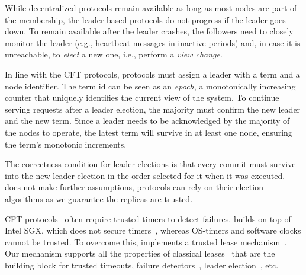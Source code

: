 While decentralized protocols remain available as long as most nodes are part of the membership, the leader-based protocols do not progress if the leader goes down. To remain available after the leader crashes, the followers need to closely monitor the leader (e.g., heartbeat messages in inactive periods) and, in case it is unreachable, to \emph{elect} a new one, i.e., perform a \emph{view change}.



In line with the CFT protocols, \projecttitle{} protocols must assign a leader with a term and a node identifier. The term id can be seen as an \emph{epoch}, a monotonically increasing counter that uniquely identifies the current view of the system. To continue serving requests after a leader election, the majority must confirm the new leader and the new term. Since a leader needs to be acknowledged by the majority of the nodes to operate, the latest term will survive in at least one node, ensuring the term's monotonic increments.

 The correctness condition for leader elections is that every commit must survive into the new leader election in the order selected for it when it was executed. \projecttitle{} does not make further assumptions, protocols can rely on their election algorithms as we guarantee the replicas are trusted.%

 CFT protocols~\cite{raft, chain-replication} often require trusted timers to detect failures. \projecttitle{} builds on top of Intel SGX, which does not secure timers~\cite{monotoniccounterssgx, sgxtrustedtime}, whereas OS-timers and software clocks cannot be trusted. To overcome this, \projecttitle{} implements a trusted lease mechanism~\cite{t-lease}. Our mechanism supports all the properties of classical leases~\cite{10.1145/74850.74870}  that are the building block for trusted timeouts, failure detectors~\cite{222603}, leader election~\cite{815321}, etc.%

